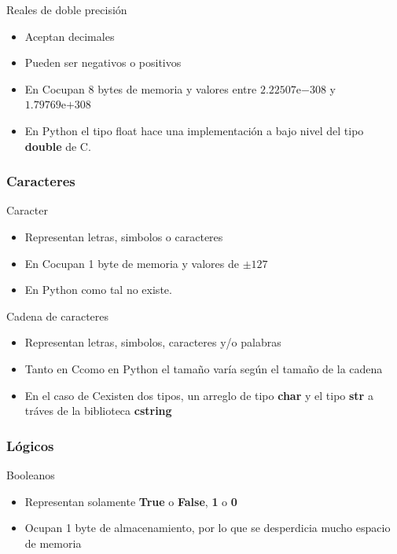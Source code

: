 \documentclass{beamer}
\newcommand{\Rplus}{\protect\hspace{-.1em}\protect\raisebox{.35ex}{\smaller{\smaller\textbf{+}}}}
\newcommand{\Cpp}{\mbox{C\Rplus\Rplus}\hspace{3pt}}
\newcommand{\expnumber}[2]{{#1}\mathrm{e}{#2}}
\begin{document}
\begin{frame}{Reales de doble precisi\'on}
    \begin{itemize}
        \item Aceptan decimales
        \item Pueden ser negativos o positivos
        \item En \Cpp  ocupan 8 bytes de memoria y valores entre $\expnumber{2.22507}{-308}$ y $\expnumber{1.79769}{+308}$ 
        \item En Python el tipo float hace una implementaci\'on a bajo nivel del tipo \textbf{double} de C.
    \end{itemize}
\end{frame}

\subsubsection{Caracteres}

\begin{frame}{Caracter}
    \begin{itemize}
        \item Representan letras, simbolos o caracteres
        \item En \Cpp  ocupan 1 byte de memoria y valores  de $\pm 127$ 
        \item En Python como tal no existe.
    \end{itemize}
\end{frame}

\begin{frame}{Cadena de caracteres}
    \begin{itemize}
        \item Representan letras, simbolos, caracteres y/o palabras
        \item Tanto en \Cpp como en Python el tamaño var\'ia seg\'un el tamaño de la cadena
        \item En el caso de \Cpp existen dos tipos, un arreglo de tipo \textbf{char} y el tipo \textbf{str} a tr\'aves de la biblioteca \textbf{cstring}
    \end{itemize}
\end{frame}

\subsubsection{Lógicos}

\begin{frame}{Booleanos}
    \begin{itemize}
        \item Representan solamente \textbf{True} o \textbf{False}, \textbf{1} o \textbf{0}
        \item Ocupan 1 byte de almacenamiento, por lo que se desperdicia mucho espacio de memoria
    \end{itemize}
\end{frame}
\end{document}
